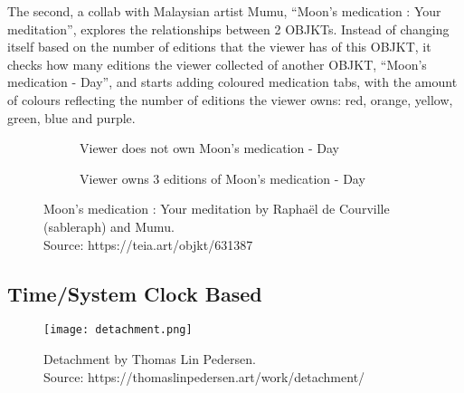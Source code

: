The second, a collab with Malaysian artist Mumu, ``Moon's medication : Your meditation'', explores the relationships between 2 OBJKTs. Instead of changing itself based on the number of editions that the viewer has of this OBJKT, it checks how many editions the viewer collected of another OBJKT, ``Moon's medication - Day'', and starts adding coloured medication tabs, with the amount of colours reflecting the number of editions the viewer owns: red, orange, yellow, green, blue and purple.

\begin{figure}[H]
  \centering
  \captionsetup{justification=centering}
  \begin{subfigure}[b]{0.45\textwidth}
    \centering
    \caption{Viewer does not own Moon's medication - Day}
    \label{fig:adam-no-own}
  \end{subfigure}
  \hfill
  \begin{subfigure}[b]{0.45\textwidth}
    \centering
    \caption{Viewer owns 3 editions of Moon's medication - Day}
    \label{fig:adam-own}
  \end{subfigure}
  \caption[Moon's medication : Your meditation]{Moon's medication : Your meditation by Raphaël de Courville (sableraph) and Mumu. \\ Source: https://teia.art/objkt/631387}
  \label{fig:vdp-examples}
\end{figure}


\subsection{Time/System Clock Based}

\begin{figure}[h]
    \centering
    \captionsetup{justification=centering}
    \texttt{[image: detachment.png]}
    \captionsetup{justification=centering}
    \caption[Detachment by Thomas Lin Pedersen]{Detachment by Thomas Lin Pedersen. \\ Source: https://thomaslinpedersen.art/work/detachment/}
    \label{fig:detachment}
\end{figure}

